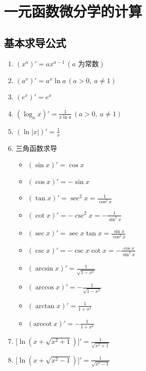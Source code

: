 \documentclass[a4paper,12pt]{article}
\begin{document}



    \section{一元函数微分学的计算}

    \subsection{基本求导公式}

    \begin{enumerate}
        \item $(x^a)' = a x^{a-1}\,(a \text{ 为常数})$

        \item $(a^x)' = a^x \ln a \,(a>0,\ a\neq1)$

        \item $(e^x)' = e^x$

        \item $(\log_a x)' = \displaystyle\frac{1}{x\ln a}
        \,(a>0,\ a\neq1)$

        \item $(\ln |x|)' = \displaystyle\frac{1}{x}$

        \item 三角函数求导
        \begin{itemize}
            \item $(\sin x)' = \cos x$
            \item $(\cos x)' = -\sin x$
            \item $(\tan x)' = \sec^2 x = \frac{1}{\cos^2 x}$
            \item $(\cot x)' = -\csc^2 x = -\frac{1}{\sin^2 x}$
            \item $(\sec x)' = \sec x \tan x = \frac{\sin x}{\cos^2 x}$
            \item $(\csc x)' = -\csc x \cot x = -\frac{\cos x}{\sin^2 x}$
            \item $(\arcsin x)' = \displaystyle\frac{1}{\sqrt{1-x^2}}$
            \item $(\arccos x)' = -\displaystyle\frac{1}{\sqrt{1-x^2}}$
            \item $(\arctan x)' = \displaystyle\frac{1}{1+x^2}$
            \item $(\mathrm{arccot}\ x)' = -\displaystyle\frac{1}{1+x^2}$
        \end{itemize}

        \item $\bigl[\ln (x+\sqrt{x^2+1})\bigr]'
        = \displaystyle\frac{1}{\sqrt{x^2+1}}$

        \item $\bigl[\ln (x+\sqrt{x^2-1})\bigr]'
        = \displaystyle\frac{1}{\sqrt{x^2-1}}$
    \end{enumerate}
\end{document}
